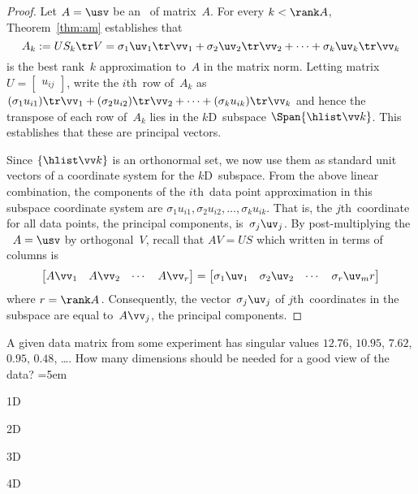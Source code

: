 \begin{proof} 
Let \(A=\usv\) be an \svd\ of matrix~\(A\).
For every \(k<\rank A\), Theorem~\ref{thm:am} establishes that 
\begin{equation*}
A_k:=US_k\tr V 
=\sigma_1\uv_1\tr\vv_1 +\sigma_2\uv_2\tr\vv_2+\cdots +\sigma_k\uv_k\tr\vv_k
\end{equation*}
is the best rank~\(k\) approximation to~\(A\) in the matrix norm.
Letting matrix \(U=\begin{bmatrix} u_{ij} \end{bmatrix}\), write the \(i\)th~row of~\(A_k\) as
\((\sigma_1u_{i1})\tr\vv_1 +(\sigma_2u_{i2})\tr\vv_2+\cdots +(\sigma_ku_{ik})\tr\vv_k\) and hence the transpose of each row of~\(A_k\) lies in the \(k\)D~subspace \(\Span\{\hlist\vv k\}\).
This establishes that these are principal vectors.

Since \(\{\hlist\vv k\}\) is an orthonormal set, we now use them as standard unit vectors of a coordinate system for the \(k\)D~subspace.
From the above linear combination, the components of the \(i\)th~data point approximation in this subspace coordinate system are \(\sigma_1u_{i1},\sigma_2u_{i2},\ldots,\sigma_ku_{ik}\).
That is, the \(j\)th~coordinate for all data points, the principal components, is~\(\sigma_j\uv_j\).
By post-multiplying the \svd\ \(A=\usv\) by orthogonal~\(V\), recall that \(AV=US\) which written in terms of columns is
\begin{equation*}
\begin{bmatrix} A\vv_1&A\vv_2&\cdots&A\vv_r \end{bmatrix}
=\begin{bmatrix} \sigma_1\uv_1&\sigma_2\uv_2&\cdots&\sigma_r\uv_mr\end{bmatrix}
\end{equation*}
where \(r=\rank A\)\,.  
Consequently, the vector~\(\sigma_j\uv_j\) of \(j\)th~coordinates in the subspace are equal to~\(A\vv_j\), the principal components.
\end{proof}




\begin{activity}
A given data matrix from some experiment has singular values \(12.76\), \(10.95\), \(7.62\), \(0.95\), \(0.48\), \ldots.  How many dimensions should be needed for a good view of the data?
\partswidth=5em
\begin{parts}
\item 1D
\item 2D
\item 3D
\item 4D
\end{parts}
\end{activity}






